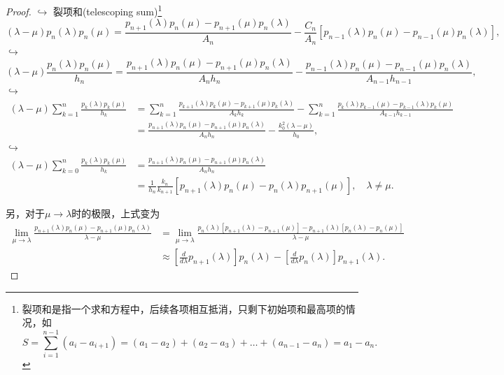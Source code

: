 \begin{subappendices}
\begin{proof}
$\hookrightarrow$ 裂项和(telescoping sum)\footnote{裂项和是指一个求和方程中，后续各项相互抵消，只剩下初始项和最高项的情况，如\begin{equation*}
S=\sum_{i=1}^{n-1} \left( a_i - a_{i+1} \right) = (a_1 - a_2) + (a_2 - a_3) + \ldots + (a_{n-1} - a_n) = a_1 - a_n.
\end{equation*}}
\begin{equation*}
    \left( \lambda - \mu \right) p_n(\lambda) p_n(\mu) = \frac{p_{n+1}(\lambda) p_n(\mu) - p_{n+1}(\mu) p_n(\lambda)}{A_n} - \frac{C_n}{A_n} \left[ p_{n-1}(\lambda) p_{n}(\mu) - p_{n-1}(\mu) p_n(\lambda) \right],
\end{equation*}
$\hookrightarrow$
\begin{equation*}
    \left( \lambda - \mu \right) \frac{p_n(\lambda) p_n(\mu)}{h_n} = \frac{p_{n+1}(\lambda) p_n(\mu) - p_{n+1}(\mu) p_n(\lambda)}{A_n h_n} - \frac{p_{n-1}(\lambda) p_{n}(\mu) - p_{n-1}(\mu) p_n(\lambda)}{A_{n-1} h_{n-1}},
\end{equation*}
$\hookrightarrow$
\begin{equation*}
  \begin{split}
    \left(\lambda - \mu \right) \sum_{k=1}^{n} \frac{p_k(\lambda) p_{k}(\mu)}{h_k} &=\sum_{k=1}^{n} \frac{
    p_{k+1}(\lambda) p_{k}(\mu) - p_{k+1}(\mu) p_{k}(\lambda)
    }{
    A_k h_k
    }
    - \sum_{k=1}^{n} \frac{
    p_k(\lambda) p_{k-1}(\mu) - p_{k-1}(\lambda) p_{k}(\mu)
    }{
    A_{k-1} h_{k-1}
    }\\
    &= \frac{
    p_{n+1}(\lambda) p_{n}(\mu) - p_{n+1}(\mu) p_{n}(\lambda)
    }{
    A_n h_n
    }
    - \frac{k_0^2 (\lambda - \mu)}{h_0},
  \end{split}
\end{equation*}
$\hookrightarrow$
\begin{equation*}
  \begin{split}
    \left(\lambda - \mu \right) \sum_{k=0}^{n} \frac{p_k(\lambda) p_{k}(\mu)}{h_k} &= \frac{p_{n+1}(\lambda) p_{n}(\mu) - p_{n+1}(\mu) p_{n}(\lambda)}{A_n h_n} \\
    &= \frac{1}{h_n} \frac{k_n}{k_{n+1}} \left[
    p_{n+1}(\lambda) p_n(\mu) - p_{n}(\lambda) p_{n+1}(\mu)
    \right], \quad \lambda \neq \mu.
  \end{split}
\end{equation*}

另，对于$\mu \rightarrow \lambda$时的极限，上式变为
\begin{equation*}
  \begin{split}
    \lim_{\mu \rightarrow \lambda} \frac{
    p_{n+1}(\lambda)p_{n}(\mu) - p_{n+1}(\mu) p_{n}(\lambda)
    }{
    \lambda - \mu
    } &= \lim_{\mu \rightarrow \lambda} \frac{
    p_n(\lambda) \left[ p_{n+1}(\lambda) - p_{n+1}(\mu) \right]
    -p_{n+1}(\lambda) \left[ p_{n}(\lambda) - p_n(\mu) \right]
    }{
    \lambda - \mu
    } \\
    & \approx \left[ \frac{d}{d \lambda} p_{n+1}(\lambda) \right] p_n(\lambda) - \left[ \frac{d}{d \lambda} p_n(\lambda) \right] p_{n+1} (\lambda).
  \end{split}
\end{equation*}


\end{proof}
\end{subappendices}
